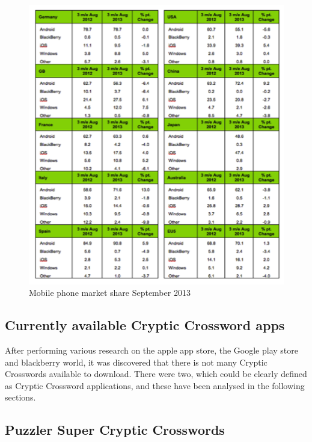 \newpage
\begin{figure}[H]
    \centering
    \includegraphics[width=\linewidth]{forbeslist13.png}
    \caption{Mobile phone market share September 2013}
\end{figure}

\begin{flushright}
\citep{forbes13}
\end{flushright}

\subsection{Currently available Cryptic Crossword apps}

After performing various research on the apple app store, the Google play store
and blackberry world, it was discovered that there is not many Cryptic
Crosswords available to download. There were two, which could be clearly defined
as Cryptic Crossword applications, and these have been analysed in the following
sections.

\subsection{Puzzler Super Cryptic Crosswords}

